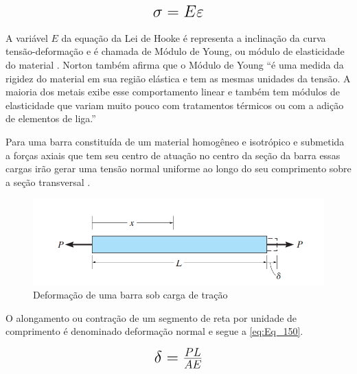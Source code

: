\begin{equation}\label{eq:Eq_140}%
\mbox{\fontsize{17.28}{21.6}\selectfont\( %
\sigma = E \varepsilon
\)} %
\end{equation}

%
%
%

\hfill

A variável $E$ da equação da Lei de Hooke é representa a inclinação da curva tensão-deformação e é chamada de Módulo de Young, ou módulo de elasticidade do
material \autocite{Norton2011}. Norton também afirma que o Módulo de Young “é uma medida da rigidez do material em sua região elástica e tem as mesmas unidades da tensão.
A maioria dos metais exibe esse comportamento linear e também tem módulos de elasticidade que variam muito pouco com tratamentos térmicos ou com a adição de elementos de liga.”

Para uma barra constituída de um material homogêneo e isotrópico e submetida a forças axiais que tem seu centro de atuação no centro da seção da barra essas cargas
irão gerar uma tensão normal uniforme ao longo do seu comprimento sobre a seção transversal \autocite{Hibbeler2010}.

\begin{figure}[htb]
	\caption{\label{fig:1030} Deformação de uma barra sob carga de tração}
	\begin{center}
		\includegraphics[width=\textwidth]{pictures/1030.png}
	\end{center}
\end{figure}

O alongamento ou contração de um segmento de reta por unidade de comprimento é denominado deformação normal e segue a \autoref{eq:Eq_150}.

\begin{equation}\label{eq:Eq_150}%
\mbox{\fontsize{17.28}{21.6}\selectfont\( %
\delta = \frac{PL}{AE}
\)} %
\end{equation}


